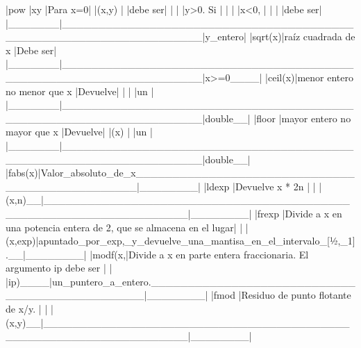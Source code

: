 |pow    |xy                                                                 |Para x=0|
|(x,y)  |                                                                   |debe ser|
|       |                                                                   |y>0. Si |
|       |                                                                   |x<0,    |
|       |                                                                   |debe ser|
|_______|___________________________________________________________________|y_entero|
|sqrt(x)|raíz cuadrada de x                                                |Debe ser|
|_______|___________________________________________________________________|x>=0____|
|ceil(x)|menor entero no menor que x                                        |Devuelve|
|       |                                                                   |un      |
|_______|___________________________________________________________________|double__|
|floor  |mayor entero no mayor que x                                        |Devuelve|
|(x)    |                                                                   |un      |
|_______|___________________________________________________________________|double__|
|fabs(x)|Valor_absoluto_de_x________________________________________________|________|
|ldexp  |Devuelve x * 2n                                                    |        |
|(x,n)__|___________________________________________________________________|________|
|frexp  |Divide a x en una potencia entera de 2, que se almacena en el lugar|        |
|(x,exp)|apuntado_por_exp,_y_devuelve_una_mantisa_en_el_intervalo_[½,_1].__|________|
|modf(x,|Divide a x en parte entera fraccionaria. El argumento ip debe ser  |        |
|ip)____|un_puntero_a_entero._______________________________________________|________|
|fmod   |Residuo de punto flotante de x/y.                                  |        |
|(x,y)__|___________________________________________________________________|________|


